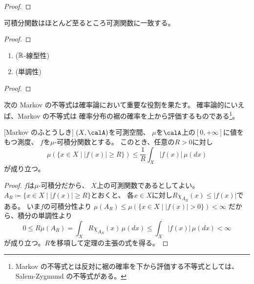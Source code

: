 \documentclass[report]{jlreq}
\begin{document}
\begin{proof}
    \TODO{}
\end{proof}

\begin{proposition}
    可積分関数はほとんど至るところ可測関数に一致する。
\end{proposition}

\begin{proof}
    \TODO{}
\end{proof}

\begin{proposition}[可積分関数の基本性質]
    \begin{enumerate}
        \item ($\mathbb{R}$-線型性)
        \item (単調性)
    \end{enumerate}
    \TODO{}
\end{proposition}

\begin{proof}
    \TODO{}
\end{proof}

次の Markov の不等式は確率論において重要な役割を果たす。
確率論的にいえば、Markov の不等式は
確率分布の裾の確率を上から評価するものである\footnote{
    Markov の不等式とは反対に裾の確率を下から評価する不等式としては、
    Salem-Zygmund の不等式がある\cite[p.142]{Bog07}。
}。

\begin{theorem}
    [Markov のふとうしき]
    $(X, \calA)$を可測空間、
    $\mu$を$\calA$上の$[0, +\infty]$に値をもつ測度、
    $f$を$\mu$-可積分関数とする。
    このとき、任意の$R > 0$に対し
    \begin{equation}
        \mu(\{ x \in X \mid |f(x)| \ge R \})
            \le \frac{1}{R} \int_X |f(x)| \, \mu(dx)
    \end{equation}
    が成り立つ。
\end{theorem}

\begin{proof}
    $f$は$\mu$-可積分だから、
    $X$上の可測関数であるとしてよい。
    $A_R \coloneqq \{ x \in X \mid |f(x)| \ge R \}$とおくと、
    各$x \in X$に対し$R \chi_{A_R}(x) \le |f(x)|$である。
    いま$f$の可積分性より
    $\mu(A_R) \le \mu(\{ x \in X \mid |f(x)| > 0 \}) < \infty$
    だから、積分の単調性より
    \begin{equation}
        0
            \le R \mu(A_R)
            = \int_X R \chi_{A_R}(x) \, \mu(dx)
            \le \int_X |f(x)| \, \mu(dx)
            < \infty
    \end{equation}
    が成り立つ。$R$を移項して定理の主張の式を得る。
\end{proof}
\end{document}
